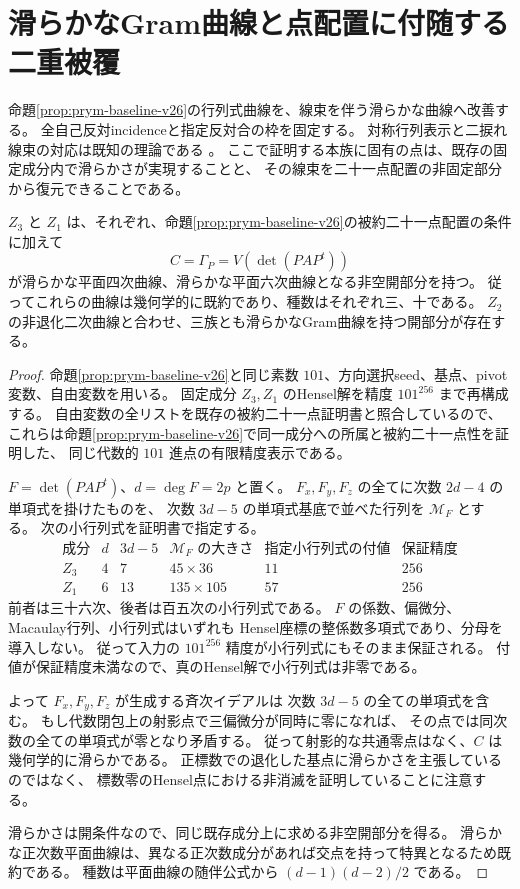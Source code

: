 \section{滑らかなGram曲線と点配置に付随する二重被覆}
\label{sec:gram-prym-v25}

命題\ref{prop:prym-baseline-v26}の行列式曲線を、線束を伴う滑らかな曲線へ改善する。
全自己反対incidenceと指定反対合の枠を固定する。
対称行列表示と二捩れ線束の対応は既知の理論である
\cite[\S2, Proposition 4.6]{BeauvilleDeterminantal}。
ここで証明する本族に固有の点は、既存の固定成分内で滑らかさが実現することと、
その線束を二十一点配置の非固定部分から復元できることである。

\begin{theorem}
\label{thm:gram-smooth-v25}
$Z_3$ と $Z_1$ は、それぞれ、命題\ref{prop:prym-baseline-v26}の被約二十一点配置の条件に加えて
\[
 C=\Gamma_P=V(\det(PAP^t))
\]
が滑らかな平面四次曲線、滑らかな平面六次曲線となる非空開部分を持つ。
従ってこれらの曲線は幾何学的に既約であり、種数はそれぞれ三、十である。
$Z_2$ の非退化二次曲線と合わせ、三族とも滑らかなGram曲線を持つ開部分が存在する。
\end{theorem}

\begin{proof}
命題\ref{prop:prym-baseline-v26}と同じ素数 $101$、方向選択seed、基点、pivot変数、自由変数を用いる。
固定成分 $Z_3,Z_1$ のHensel解を精度 $101^{256}$ まで再構成する。
自由変数の全リストを既存の被約二十一点証明書と照合しているので、
これらは命題\ref{prop:prym-baseline-v26}で同一成分への所属と被約二十一点性を証明した、
同じ代数的 $101$ 進点の有限精度表示である。

$F=\det(PAP^t)$、$d=\deg F=2p$ と置く。
$F_x,F_y,F_z$ の全てに次数 $2d-4$ の単項式を掛けたものを、
次数 $3d-5$ の単項式基底で並べた行列を $\mathcal M_F$ とする。
次の小行列式を証明書で指定する。
\[
\begin{array}{c|c|c|c|c|c}
 \text{成分}&d&3d-5&\mathcal M_F\text{ の大きさ}&
 \text{指定小行列式の付値}&\text{保証精度}\\\hline
 Z_3&4&7&45\times36&11&256\\
 Z_1&6&13&135\times105&57&256
\end{array}
\]
前者は三十六次、後者は百五次の小行列式である。
$F$ の係数、偏微分、Macaulay行列、小行列式はいずれも
Hensel座標の整係数多項式であり、分母を導入しない。
従って入力の $101^{256}$ 精度が小行列式にもそのまま保証される。
付値が保証精度未満なので、真のHensel解で小行列式は非零である。

よって $F_x,F_y,F_z$ が生成する斉次イデアルは
次数 $3d-5$ の全ての単項式を含む。
もし代数閉包上の射影点で三偏微分が同時に零になれば、
その点では同次数の全ての単項式が零となり矛盾する。
従って射影的な共通零点はなく、$C$ は幾何学的に滑らかである。
正標数での退化した基点に滑らかさを主張しているのではなく、
標数零のHensel点における非消滅を証明していることに注意する。

滑らかさは開条件なので、同じ既存成分上に求める非空開部分を得る。
滑らかな正次数平面曲線は、異なる正次数成分があれば交点を持って特異となるため既約である。
種数は平面曲線の随伴公式から $(d-1)(d-2)/2$ である。
\end{proof}

